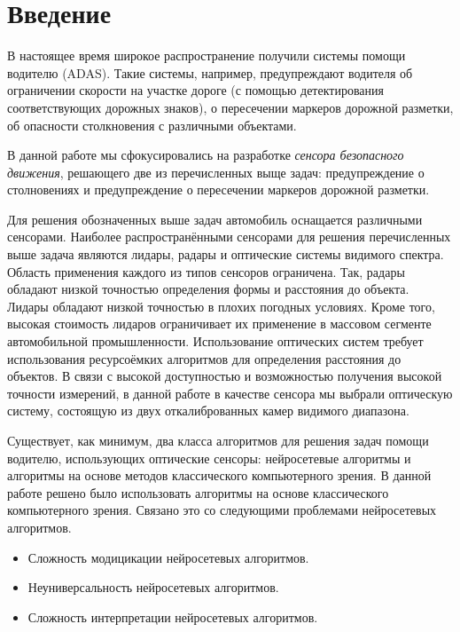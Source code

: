 \documentclass[aps,%
14pt,%
final,%
oneside,
onecolumn,%
musixtex, %
superscriptaddress,%
centertags]{extarticle} %
\begin{document}
\tableofcontents

\newpage

\section*{Введение}




В настоящее время широкое распространение получили системы помощи водителю (ADAS). Такие системы, например, предупреждают водителя об ограничении скорости на участке дороге (с помощью детектирования соответствующих дорожных знаков), о пересечении маркеров дорожной разметки, об опасности столкновения с различными объектами.

В данной работе мы сфокусировались на разработке \textit{сенсора безопасного движения}, решающего две из перечисленных выще задач: предупреждение о столновениях и предупреждение о пересечении маркеров дорожной разметки. 

Для решения обозначенных выше задач автомобиль оснащается различными сенсорами. Наиболее распространёнными сенсорами для решения перечисленных выше задача являются лидары, радары и оптические системы видимого спектра. Область применения каждого из типов сенсоров ограничена. Так, радары обладают низкой точностью определения формы и расстояния до объекта. Лидары обладают низкой точностью в плохих погодных условиях. Кроме того, высокая стоимость лидаров ограничивает их применение в массовом сегменте автомобильной промышленности. Использование оптических систем требует использования ресурсоёмких алгоритмов для определения расстояния до объектов. В связи с высокой доступностью и возможностью получения высокой точности измерений, в данной работе в качестве сенсора мы выбрали оптическую систему, состоящую из двух откалиброванных камер видимого диапазона.

Существует, как минимум, два класса алгоритмов для решения задач помощи водителю, использующих оптические сенсоры: нейросетевые алгоритмы и алгоритмы на основе методов классического компьютерного зрения. В данной работе решено было использовать алгоритмы на основе классического компьютерного зрения. Связано это со следующими проблемами нейросетевых алгоритмов.
\begin{itemize}
\item Сложность модицикации нейросетевых алгоритмов.
\item Неуниверсальность нейросетевых алгоритмов.
\item Сложность интерпретации нейросетевых алгоритмов.
\end{itemize}
\end{document}
